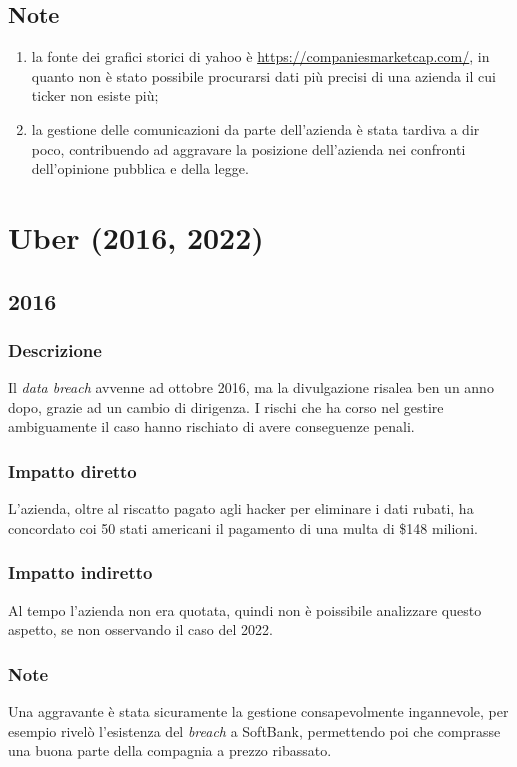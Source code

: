 \documentclass[12pt,a4paper,openright,twoside]{report}
\begin{document}
\subsection{Note}
\begin{enumerate}
    \item la fonte dei grafici storici di yahoo \`e \href{https://companiesmarketcap.com/yahoo/stock-price-history}{https://companiesmarketcap.com/}, in quanto non \`e stato possibile procurarsi dati pi\`u precisi di una azienda il cui ticker non esiste pi\`u;
    \item la gestione delle comunicazioni da parte dell'azienda \`e stata tardiva a dir poco, contribuendo ad aggravare la posizione dell'azienda nei confronti dell'opinione pubblica e della legge.
\end{enumerate}
\section{Uber (2016, 2022)}
\subsection{2016}
\subsubsection{Descrizione}
Il \textit{data breach} avvenne ad ottobre 2016, ma la divulgazione risalea ben un anno dopo, grazie ad un cambio di dirigenza. I rischi che ha corso nel gestire ambiguamente il caso hanno rischiato di avere conseguenze penali\cite{Uber_plusEquifaxAndYahoo}.\\ 
\subsubsection{Impatto diretto}
L'azienda, oltre al riscatto pagato agli hacker per eliminare i dati rubati, ha concordato coi 50 stati americani il pagamento di una multa di \$148 milioni.\\
\subsubsection{Impatto indiretto}
Al tempo l'azienda non era quotata, quindi non \`e poissibile analizzare questo aspetto, se non osservando il caso del 2022.\\
\subsubsection{Note}
Una aggravante \`e stata sicuramente la gestione consapevolmente ingannevole, per esempio rivel\`o l'esistenza del \textit{breach} a SoftBank, permettendo poi che comprasse una buona parte della compagnia a prezzo ribassato\cite{Uber_plusEquifaxAndYahoo}.\\   
\end{document}
